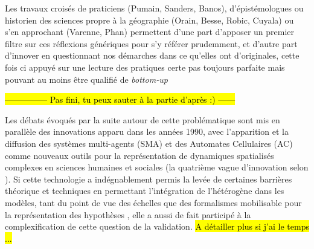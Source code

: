 Les travaux croisés de praticiens (Pumain, Sanders, Banos), d'épistémologues ou historien des sciences propre à la géographie (Orain, Besse, Robic, Cuyala) ou s'en approchant (Varenne, Phan) permettent d'une part d'apposer un premier filtre sur ces réflexions génériques pour s'y référer prudemment, et d'autre part d'innover en questionnant nos démarches dans ce qu'elles ont d'originales, cette fois ci appuyé sur une lecture des pratiques certe pas toujours parfaite mais pouvant au moins être qualifié de \textit{bottom-up} 







\hl{--------------- Pas fini, tu peux sauter à la partie d'après :) ------}

Les débats évoqués par la suite autour de cette problématique sont mis en parallèle des innovations apparu dans les années 1990, avec l'apparition et la diffusion des systèmes multi-agents (SMA) et des Automates Cellulaires (AC) comme nouveaux outils pour la représentation de dynamiques spatialisés complexes en sciences humaines et sociales (la quatrième vague d'innovation selon \autocite{Banos2013a}). Si cette technologie a indégnablement permis la levée de certaines barrières théorique et techniques en permettant l'intégration de l'hétérogène dans les modèles, tant du point de vue des échelles que des formalismes mobilisable pour la représentation des hypothèses , elle a aussi de fait participé à la complexification de cette question de la validation. \autocite[38-41]{Varenne2013} \hl{A détailler plus si j'ai le temps ... }

